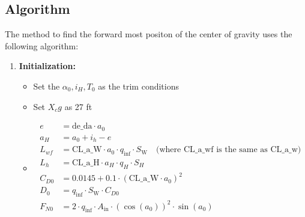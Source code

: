 \documentclass[a4paper, twoside]{article}
\begin{document}
\subsection{Algorithm}
The method to find the forward most positon of the center of gravity uses the following algorithm: \\
\begin{enumerate}
    \item \textbf{Initialization:}
        \begin{itemize}
            \item Set the $\alpha_0,i_H,T_0$ as the trim conditions
            \item Set \(X_cg\) as 27 ft
            \item \begin{equation}
              \begin{aligned}
                  e &= \text{{de\_da}} \cdot a_0 \\
                  a_H &= a_0 + i_h - e \\
                  L_{wf} &= \text{{CL\_a\_W}} \cdot a_0 \cdot q_{\text{{inf}}} \cdot S_{\text{{W}}} \quad \text{{(where CL\_a\_wf is the same as CL\_a\_w)}} \\
                  L_h &= \text{{CL\_a\_H}} \cdot a_H \cdot q_H \cdot S_H \\
                  C_{D0} &= 0.0145 + 0.1 \cdot (\text{{CL\_a\_W}} \cdot a_0)^2 \\
                  D_0 &= q_{\text{{inf}}} \cdot S_{\text{{W}}} \cdot C_{D0} \\
                  F_{N0} &= 2 \cdot q_{\text{{inf}}} \cdot A_{\text{{in}}} \cdot (\cos(a_0))^2 \cdot \sin(a_0) \\
              \end{aligned}
              \end{equation}
        \end{itemize}
        

\end{enumerate}
\end{document}
